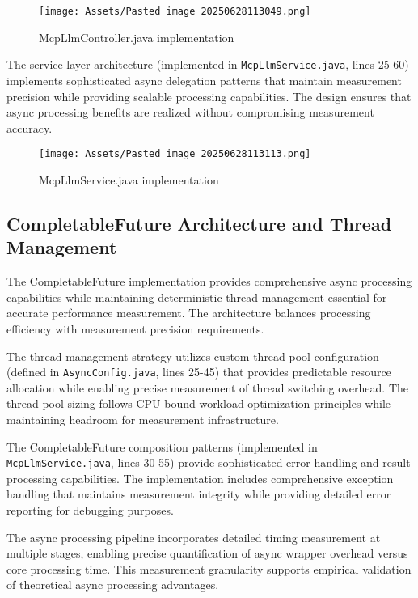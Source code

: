 \begin{figure}[H]
    \centering
    \texttt{[image: Assets/Pasted image 20250628113049.png]}
    \caption{McpLlmController.java implementation}
\end{figure}


The service layer architecture (implemented in \texttt{McpLlmService.java}, lines 25-60) implements sophisticated async delegation patterns that maintain measurement precision while providing scalable processing capabilities. The design ensures that async processing benefits are realized without compromising measurement accuracy.

\begin{figure}[H]
    \centering
    \texttt{[image: Assets/Pasted image 20250628113113.png]}
    \caption{McpLlmService.java implementation}
\end{figure}

\subsection{CompletableFuture Architecture and Thread Management}

The CompletableFuture implementation provides comprehensive async processing capabilities while maintaining deterministic thread management essential for accurate performance measurement. The architecture balances processing efficiency with measurement precision requirements.

The thread management strategy utilizes custom thread pool configuration (defined in \texttt{AsyncConfig.java}, lines 25-45) that provides predictable resource allocation while enabling precise measurement of thread switching overhead. The thread pool sizing follows CPU-bound workload optimization principles while maintaining headroom for measurement infrastructure.


The CompletableFuture composition patterns (implemented in \texttt{McpLlmService.java}, lines 30-55) provide sophisticated error handling and result processing capabilities. The implementation includes comprehensive exception handling that maintains measurement integrity while providing detailed error reporting for debugging purposes.


The async processing pipeline incorporates detailed timing measurement at multiple stages, enabling precise quantification of async wrapper overhead versus core processing time. This measurement granularity supports empirical validation of theoretical async processing advantages.

